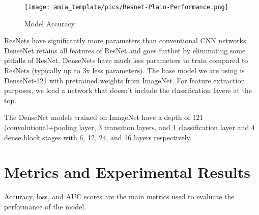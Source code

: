 \documentclass{amia}
\begin{document}
\begin{figure}[h!]
\centering
\texttt{[image: amia\_template/pics/Resnet-Plain-Performance.png]}
\caption{Model Accuracy}
\label{fig3}
\end{figure}

ResNets have significantly more parameters than conventional CNN networks. DenseNet retains all features of ResNet and goes further by eliminating some pitfalls of ResNet. DenseNets have much less parameters to train compared to ResNets (typically up to 3x less parameters). The base model we are using is DenseNet-121 with pretrained weights from ImageNet. For feature extraction purposes, we load a network that doesn't include the classification layers at the top.

The DenseNet models trained on ImageNet have a depth of 121 (convolutional+pooling layer, 3 transition layers, and 1 classification layer and 4 dense block stages with 6, 12, 24, and 16 layers respectively.

\section*{Metrics and Experimental Results}
Accuracy, loss, and AUC scores are the main metrics used to evaluate the performance of the model.
\end{document}
